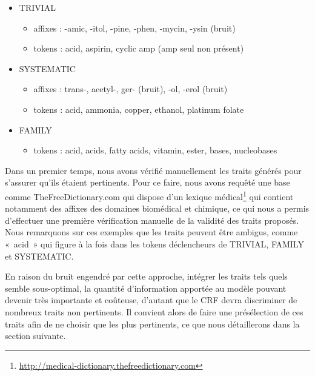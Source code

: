 \documentclass[12pt,a4paper,times,twoside,openright]{report}
\begin{document}
\begin{itemize}
    \item TRIVIAL
        \begin{itemize}
            \item affixes : -amic, -itol, -pine, -phen, -mycin, -ysin (bruit)
            \item tokens : acid, aspirin, cyclic amp (amp seul non présent)
        \end{itemize}
    \item SYSTEMATIC
        \begin{itemize}
            \item affixes : trans-, acetyl-, ger- (bruit), -ol, -erol (bruit)
            \item tokens : acid, ammonia, copper, ethanol, platinum folate
        \end{itemize}
    \item FAMILY
        \begin{itemize}
            \item tokens : acid, acids, fatty acids, vitamin, ester, bases, nucleobases
        \end{itemize}
\end{itemize}

Dans un premier temps, nous avons vérifié manuellement les traits générés pour s'assurer qu'ils étaient pertinents. Pour ce faire, nous avons requêté une base comme TheFreeDictionary.com qui dispose d'un lexique médical\footnote{\url{http://medical-dictionary.thefreedictionary.com}} qui contient notamment des affixes des domaines biomédical et chimique, ce qui nous a permis d'effectuer une première vérification manuelle de la validité des traits proposés. Nous remarquons sur ces exemples que les traits peuvent être ambigus, comme «\ acid\ » qui figure à la fois dans les tokens déclencheurs de TRIVIAL, FAMILY et SYSTEMATIC.

En raison du bruit engendré par cette approche, intégrer les traits tels quels semble sous-optimal, la quantité d'information apportée au modèle pouvant devenir très importante et coûteuse, d'autant que le CRF devra discriminer de nombreux traits non pertinents. Il convient alors de faire une présélection de ces traits afin de ne choisir que les plus pertinents, ce que nous détaillerons dans la section suivante.


        
\end{document}
